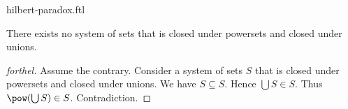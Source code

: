 \documentclass{naproche-library}
\begin{document}
\begin{smodule}{hilbert-paradox.ftl}

  \begin{theorem*}[forthel,title=Hilbert's Paradox,id=hilbert_paradox]
    There exists no system of sets that is closed under powersets and closed under unions.
  \end{theorem*}
  \begin{proof}[forthel]
    Assume the contrary.
    Consider a system of sets $S$ that is closed under powersets and closed under unions.
    We have $S \subseteq S$.
    Hence $\bigcup S \in S$.
    Thus $\pow(\bigcup S) \in S$.
    Contradiction.
  \end{proof}
\end{smodule}
\end{document}
